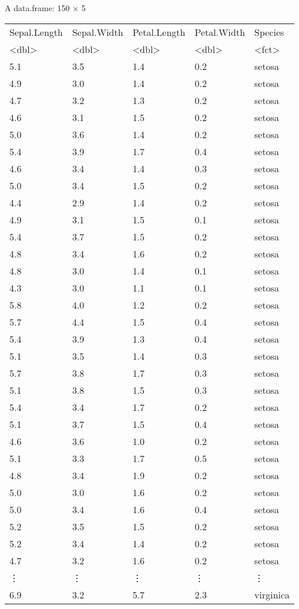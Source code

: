 \documentclass[11pt]{article}
\begin{document}
    A data.frame: 150 × 5
\begin{tabular}{lllll}
 Sepal.Length & Sepal.Width & Petal.Length & Petal.Width & Species\\
 <dbl> & <dbl> & <dbl> & <dbl> & <fct>\\
\hline
	 5.1 & 3.5 & 1.4 & 0.2 & setosa\\
	 4.9 & 3.0 & 1.4 & 0.2 & setosa\\
	 4.7 & 3.2 & 1.3 & 0.2 & setosa\\
	 4.6 & 3.1 & 1.5 & 0.2 & setosa\\
	 5.0 & 3.6 & 1.4 & 0.2 & setosa\\
	 5.4 & 3.9 & 1.7 & 0.4 & setosa\\
	 4.6 & 3.4 & 1.4 & 0.3 & setosa\\
	 5.0 & 3.4 & 1.5 & 0.2 & setosa\\
	 4.4 & 2.9 & 1.4 & 0.2 & setosa\\
	 4.9 & 3.1 & 1.5 & 0.1 & setosa\\
	 5.4 & 3.7 & 1.5 & 0.2 & setosa\\
	 4.8 & 3.4 & 1.6 & 0.2 & setosa\\
	 4.8 & 3.0 & 1.4 & 0.1 & setosa\\
	 4.3 & 3.0 & 1.1 & 0.1 & setosa\\
	 5.8 & 4.0 & 1.2 & 0.2 & setosa\\
	 5.7 & 4.4 & 1.5 & 0.4 & setosa\\
	 5.4 & 3.9 & 1.3 & 0.4 & setosa\\
	 5.1 & 3.5 & 1.4 & 0.3 & setosa\\
	 5.7 & 3.8 & 1.7 & 0.3 & setosa\\
	 5.1 & 3.8 & 1.5 & 0.3 & setosa\\
	 5.4 & 3.4 & 1.7 & 0.2 & setosa\\
	 5.1 & 3.7 & 1.5 & 0.4 & setosa\\
	 4.6 & 3.6 & 1.0 & 0.2 & setosa\\
	 5.1 & 3.3 & 1.7 & 0.5 & setosa\\
	 4.8 & 3.4 & 1.9 & 0.2 & setosa\\
	 5.0 & 3.0 & 1.6 & 0.2 & setosa\\
	 5.0 & 3.4 & 1.6 & 0.4 & setosa\\
	 5.2 & 3.5 & 1.5 & 0.2 & setosa\\
	 5.2 & 3.4 & 1.4 & 0.2 & setosa\\
	 4.7 & 3.2 & 1.6 & 0.2 & setosa\\
	 ⋮ & ⋮ & ⋮ & ⋮ & ⋮\\
	 6.9 & 3.2 & 5.7 & 2.3 & virginica\\

\end{tabular}
\end{document}
